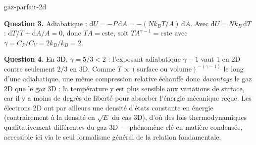 \begin{exo}{gaz-parfait-2d}
\begin{solution}
\textbf{Question 3.} Adiabatique : $\mathrm{d}U = -P\,\mathrm{d}A = -(Nk_BT/A)\,\mathrm{d}A$. Avec $\mathrm{d}U = Nk_B\,\mathrm{d}T$ : $\mathrm{d}T/T + \mathrm{d}A/A = 0$, donc $TA = \text{cste}$, soit $TA^{\gamma-1} = \text{cste}$ avec $\gamma = C_P/C_V = 2k_B/k_B = 2$.

\textbf{Question 4.} En 3D, $\gamma = 5/3 < 2$ : l'exposant adiabatique $\gamma - 1$ vaut $1$ en 2D contre seulement $2/3$ en 3D. Comme $T \propto (\text{surface ou volume})^{-(\gamma-1)}$ le long d'une adiabatique, une même compression relative échauffe donc \emph{davantage} le gaz 2D que le gaz 3D : la température y est plus sensible aux variations de surface, car il y a moins de degrés de liberté pour absorber l'énergie mécanique reçue. Les électrons 2D ont par ailleurs une densité d'états constante en énergie (contrairement à la densité en $\sqrt{E}$ du cas 3D), d'où des lois thermodynamiques qualitativement différentes du gaz 3D — phénomène clé en matière condensée, accessible ici via le seul formalisme général de la relation fondamentale.
\end{solution}
\end{exo}

